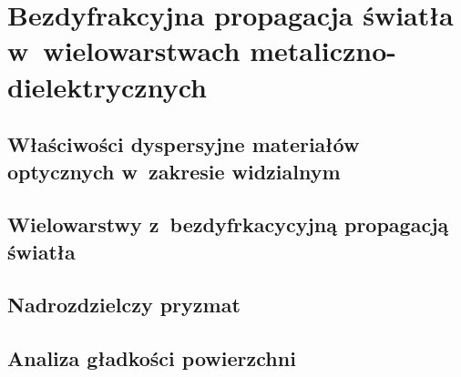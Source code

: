 \chapter{Bezdyfrakcyjna propagacja światła w~wielowarstwach metaliczno-dielektrycznych}
\label{art:nondiff}

\section{Właściwości dyspersyjne materiałów optycznych w~zakresie widzialnym}

\section{Wielowarstwy z~bezdyfrkacycyjną propagacją światła}

\section{Nadrozdzielczy pryzmat}


\section{Analiza gładkości powierzchni}



